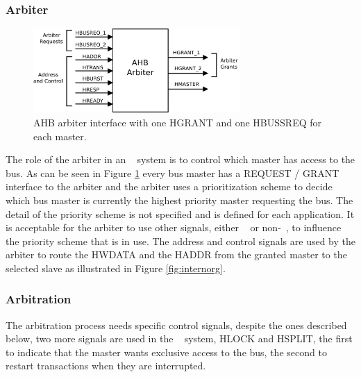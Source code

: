 \subsubsection{Arbiter}
\begin{figure}[ht]
    \centering
    \includegraphics[width=0.7\textwidth]{figures/pdf/ahb_arbiter_new.pdf}
    \caption{AHB arbiter interface with one HGRANT and one HBUSSREQ for each master.}
    \label{fig:arbiterint}
\end{figure}

 The role of the arbiter in an \amba~ system is to control which master has access to the bus. As can be seen in Figure \ref{fig:arbiterint} every bus master has a REQUEST / GRANT interface to the arbiter and the arbiter uses a prioritization scheme to decide which bus master is currently the highest priority master requesting the bus. The detail of the priority scheme is not specified and is defined for each application. It is acceptable for the arbiter to use other signals, either \amba~ or non-\amba~, to influence the priority scheme that is in use.
 The address and control signals are used by the arbiter to route the HWDATA and the HADDR from the granted master to the selected slave as illustrated in Figure     \ref{fig:internorg}.
 
 
 \subsubsection{Arbitration}
 
 The arbitration process needs specific control signals, despite the ones described below, two more signals are used in the \amba~ system, HLOCK and HSPLIT,  the first to indicate that the master wants exclusive access to the bus, the second to restart transactions when they are interrupted.
 
